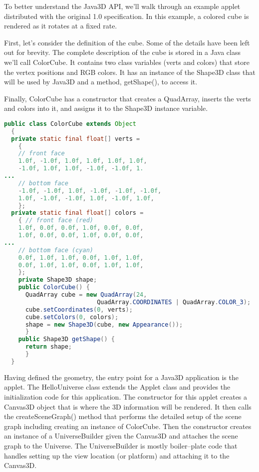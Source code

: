 To better understand the Java3D API, we’ll walk through an example applet distributed with the original 1.0 specification. In this example, a colored cube is rendered as it rotates at a fixed rate.

First, let's consider the definition of the cube. Some of the details have been left out for brevity. The complete description of the cube is stored in a Java class we’ll call ColorCube. It contains two class variables (verts and colors) that store the vertex positions and RGB colors. It has an instance of the Shape3D class that will be used by Java3D and a method, getShape(), to access it.

Finally, ColorCube has a constructor that creates a QuadArray, inserts the verts and colors into it, and assigns it to the Shape3D instance variable.

\begin{lstlisting}[language=Java, caption={}, numbers=none, frame=none]
public class ColorCube extends Object
  {
  private static final float[] verts =
    {
    // front face
    1.0f, -1.0f, 1.0f, 1.0f, 1.0f, 1.0f,
    -1.0f, 1.0f, 1.0f, -1.0f, -1.0f, 1.
...
    // bottom face
    -1.0f, -1.0f, 1.0f, -1.0f, -1.0f, -1.0f,
    1.0f, -1.0f, -1.0f, 1.0f, -1.0f, 1.0f,
    };
  private static final float[] colors =
    { // front face (red)
    1.0f, 0.0f, 0.0f, 1.0f, 0.0f, 0.0f,
    1.0f, 0.0f, 0.0f, 1.0f, 0.0f, 0.0f,
...
    // bottom face (cyan)
    0.0f, 1.0f, 1.0f, 0.0f, 1.0f, 1.0f,
    0.0f, 1.0f, 1.0f, 0.0f, 1.0f, 1.0f,
    };
    private Shape3D shape;
    public ColorCube() {
      QuadArray cube = new QuadArray(24,
                          QuadArray.COORDINATES | QuadArray.COLOR_3);
      cube.setCoordinates(0, verts);
      cube.setColors(0, colors);
      shape = new Shape3D(cube, new Appearance());
      }
    public Shape3D getShape() {
      return shape;
      }
  }
\end{lstlisting}

Having defined the geometry, the entry point for a Java3D application is the applet. The HelloUniverse class extends the Applet class and provides the initialization code for this application. The constructor for this applet creates a Canvas3D object that is where the 3D information will be rendered. It then calls the createSceneGraph() method that performs the detailed setup of the scene graph including creating an instance of ColorCube. Then the constructor creates an instance of a UniverseBuilder given the Canvas3D and attaches the scene graph to the Universe. The UniverseBuilder is mostly boiler--plate code that handles setting up the view location (or platform) and attaching it to the Canvas3D.

